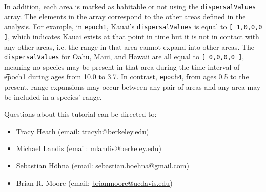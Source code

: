 In addition, each area is marked as habitable or not using the {\tt dispersalValues} array.
The elements in the array correspond to the other areas defined in the analysis.
For example, in {\tt epoch1}, Kauai's {\tt dispersalValues} is equal to {\tt [ 1,0,0,0 ]}, which indicates Kauai exists at that point in time but it is not in contact with any other areas, i.e. the range in that area cannot expand into other areas.
The {\tt dispersalValues} for Oahu, Maui, and Hawaii are all equal to {\tt [ 0,0,0,0 ]}, meaning no species may be present in that area during the time interval of {\t epoch1} during ages from 10.0 to 3.7. In contrast, {\tt epoch4}, from ages 0.5 to the present, range expansions may occur between any pair of areas and any area may be included in a species' range.


\vspace{5cm}
Questions about this tutorial can be directed to: \\\vspace{-10mm}
\begin{itemize}
\item Tracy Heath (email: \href{mailto:tracyh@berkeley.edu}{tracyh@berkeley.edu}) \\\vspace{-8mm}
\item Michael Landis (email: \href{mailto:mlandis@berkeley.edu}{mlandis@berkeley.edu}) \\\vspace{-8mm} 
\item Sebastian H\"{o}hna (email: \href{mailto:sebastian.hoehna@gmail.com}{sebastian.hoehna@gmail.com}) \\\vspace{-8mm}
\item Brian R. Moore (email: \href{mailto:brianmoore@ucdavis.edu}{brianmoore@ucdavis.edu}) \\\vspace{-8mm}
\end{itemize}


%
%
